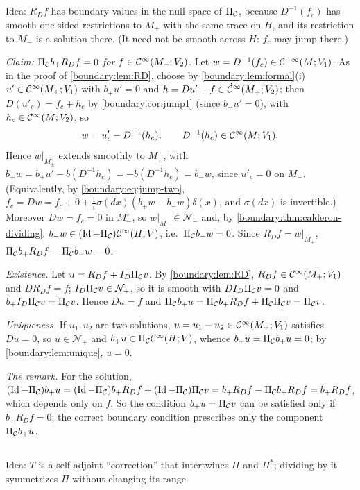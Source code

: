 \subsection*{}
Idea: $R_Df$ has boundary values in the null space of $\Pi_{\mathcal{C}}$, because $D^{-1}(f_c)$
has smooth one-sided restrictions to $M_\pm$ with the same trace on $H$, and its
restriction to $M_-$ is a solution there. (It need not be smooth across $H$: $f_c$ may
jump there.)

\emph{Claim: $\Pi_{\mathcal{C}} b_+R_Df=0$ for $f\in\mathcal{C}^\infty(M_+;V_2)$.} Let $w=D^{-1}(f_c)\in\mathcal{C}^{-\infty}(M;V_1)$. As in
the proof of \cref{boundary:lem:RD}, choose by \cref{boundary:lem:formal}(i)
$u'\in\mathcal{C}^\infty(M_+;V_1)$ with $b_+u'=0$ and $h=Du'-f\in\dot{\mathcal{C}}^\infty(M_+;V_2)$; then $D(u'_c)=f_c+h_c$
by \cref{boundary:cor:jump1} (since $b_+u'=0$), with $h_c\in\mathcal{C}^\infty(M;V_2)$, so
\begin{equation*}
w=u'_c-D^{-1}(h_c),\qquad D^{-1}(h_c)\in\mathcal{C}^\infty(M;V_1).
\end{equation*}
Hence $w|_{M_\pm^\circ}$ extends smoothly to $M_\pm$, with $b_+w=b_+u'-b(D^{-1}h_c)=
-b(D^{-1}h_c)=b_-w$, since $u'_c=0$ on $M_-$. (Equivalently, by \eqref{boundary:eq:jump-two},
$f_c=Dw=f_c+0+\frac1i\sigma(dx)(b_+w-b_-w)\delta(x)$, and $\sigma(dx)$ is invertible.)
Moreover $Dw=f_c=0$ in $M_-^\circ$, so $w|_{M_-}\in\mathcal{N}_-$ and, by
\cref{boundary:thm:calderon-dividing}, $b_-w\in(\operatorname{Id}-\Pi_{\mathcal{C}})\mathcal{C}^\infty(H;V)$, i.e.\ $\Pi_{\mathcal{C}} b_-w=0$.
Since $R_Df=w|_{M_+}$, $\Pi_{\mathcal{C}} b_+R_Df=\Pi_{\mathcal{C}} b_-w=0$.

\emph{Existence.} Let $u=R_Df+I_D\Pi_{\mathcal{C}} v$. By \cref{boundary:lem:RD}, $R_Df\in\mathcal{C}^\infty(M_+;V_1)$
and $DR_Df=f$; $I_D\Pi_{\mathcal{C}} v\in\mathcal{N}_+$, so it is smooth with $DI_D\Pi_{\mathcal{C}} v=0$ and
$b_+I_D\Pi_{\mathcal{C}} v=\Pi_{\mathcal{C}} v$. Hence $Du=f$ and $\Pi_{\mathcal{C}} b_+u=\Pi_{\mathcal{C}} b_+R_Df+\Pi_{\mathcal{C}}\Pi_{\mathcal{C}} v=\Pi_{\mathcal{C}} v$.

\emph{Uniqueness.} If $u_1,u_2$ are two solutions, $u=u_1-u_2\in\mathcal{C}^\infty(M_+;V_1)$ satisfies
$Du=0$, so $u\in\mathcal{N}_+$ and $b_+u\in\Pi_{\mathcal{C}}\mathcal{C}^\infty(H;V)$, whence $b_+u=\Pi_{\mathcal{C}} b_+u=0$; by
\cref{boundary:lem:unique}, $u=0$.

\emph{The remark.} For the solution, $(\operatorname{Id}-\Pi_{\mathcal{C}})b_+u=(\operatorname{Id}-\Pi_{\mathcal{C}})b_+R_Df+(\operatorname{Id}-\Pi_{\mathcal{C}})\Pi_{\mathcal{C}} v=
b_+R_Df-\Pi_{\mathcal{C}} b_+R_Df=b_+R_Df$, which depends only on $f$. So the condition $b_+u=\Pi_{\mathcal{C}} v$
can be satisfied only if $b_+R_Df=0$; the correct boundary condition prescribes only the
component $\Pi_{\mathcal{C}} b_+u$.

\subsection*{}
Idea: $T$ is a self-adjoint ``correction'' that intertwines $\Pi$ and $\Pi^*$; dividing by it
symmetrizes $\Pi$ without changing its range.

